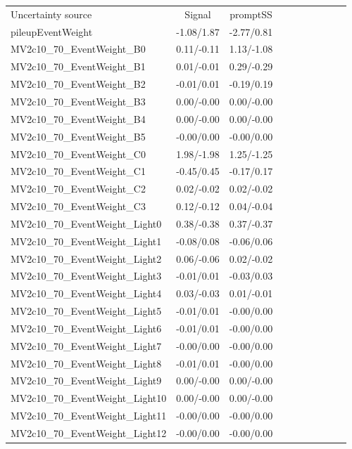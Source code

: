 \begin{table}[h]
\scriptsize
\begin{center}
\begin{tabular}{l|ccccccccc}
\hline
\hline
Uncertainty source &Signal &promptSS \\
pileupEventWeight &-1.08/1.87 &-2.77/0.81 \\
MV2c10\_70\_EventWeight\_B0 &0.11/-0.11 &1.13/-1.08 \\
MV2c10\_70\_EventWeight\_B1 &0.01/-0.01 &0.29/-0.29 \\
MV2c10\_70\_EventWeight\_B2 &-0.01/0.01 &-0.19/0.19 \\
MV2c10\_70\_EventWeight\_B3 &0.00/-0.00 &0.00/-0.00 \\
MV2c10\_70\_EventWeight\_B4 &0.00/-0.00 &0.00/-0.00 \\
MV2c10\_70\_EventWeight\_B5 &-0.00/0.00 &-0.00/0.00 \\
MV2c10\_70\_EventWeight\_C0 &1.98/-1.98 &1.25/-1.25 \\
MV2c10\_70\_EventWeight\_C1 &-0.45/0.45 &-0.17/0.17 \\
MV2c10\_70\_EventWeight\_C2 &0.02/-0.02 &0.02/-0.02 \\
MV2c10\_70\_EventWeight\_C3 &0.12/-0.12 &0.04/-0.04 \\
MV2c10\_70\_EventWeight\_Light0 &0.38/-0.38 &0.37/-0.37 \\
MV2c10\_70\_EventWeight\_Light1 &-0.08/0.08 &-0.06/0.06 \\
MV2c10\_70\_EventWeight\_Light2 &0.06/-0.06 &0.02/-0.02 \\
MV2c10\_70\_EventWeight\_Light3 &-0.01/0.01 &-0.03/0.03 \\
MV2c10\_70\_EventWeight\_Light4 &0.03/-0.03 &0.01/-0.01 \\
MV2c10\_70\_EventWeight\_Light5 &-0.01/0.01 &-0.00/0.00 \\
MV2c10\_70\_EventWeight\_Light6 &-0.01/0.01 &-0.00/0.00 \\
MV2c10\_70\_EventWeight\_Light7 &-0.00/0.00 &-0.00/0.00 \\
MV2c10\_70\_EventWeight\_Light8 &-0.01/0.01 &-0.00/0.00 \\
MV2c10\_70\_EventWeight\_Light9 &0.00/-0.00 &0.00/-0.00 \\
MV2c10\_70\_EventWeight\_Light10 &0.00/-0.00 &0.00/-0.00 \\
MV2c10\_70\_EventWeight\_Light11 &-0.00/0.00 &-0.00/0.00 \\
MV2c10\_70\_EventWeight\_Light12 &-0.00/0.00 &-0.00/0.00 \\

\end{tabular}
\end{center}
\end{table}
